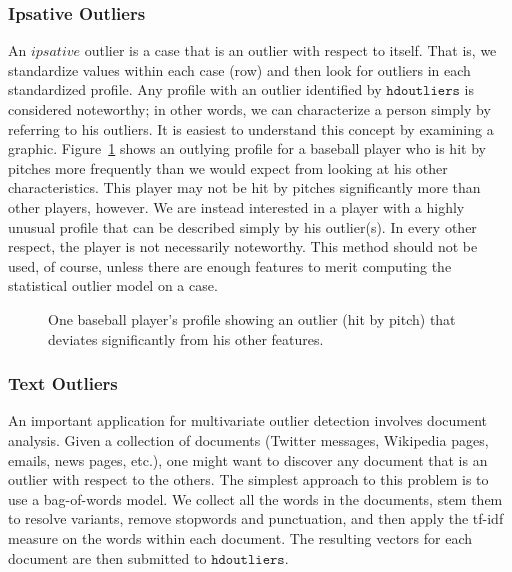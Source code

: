 \documentclass[12pt]{article}
\begin{document}
\subsubsection{Ipsative Outliers}
An $ipsative$ outlier is a case that is an outlier with respect to itself. That is, we standardize values within each case (row) and then look for outliers in each standardized profile. Any profile with an outlier identified by $\mathtt{hdoutliers}$ is considered noteworthy; in other words, we can characterize a person simply by referring to his outliers. It is easiest to understand this concept by examining a graphic. Figure~\ref{fig:baseball} shows an outlying profile for a baseball player who is hit by pitches more frequently than we would expect from looking at his other characteristics. This player may not be hit by pitches significantly more than other players, however. We are instead interested in a player with a highly unusual profile that can be described simply by his outlier(s). In every other respect, the player is not necessarily noteworthy. This method should not be used, of course, unless there are enough features to merit computing the statistical outlier model on a case.

\begin{figure}[h]
\caption{\label{fig:baseball} One baseball player's profile showing an outlier (hit by pitch) that deviates significantly from his other features.}
\end{figure}


\subsubsection{Text Outliers}
An important application for multivariate outlier detection involves document analysis. Given a collection of documents (Twitter messages, Wikipedia pages, emails, news pages, etc.), one might want to discover any document that is an outlier with respect to the others. The simplest approach to this problem is to use a bag-of-words model. We collect all the words in the documents, stem them to resolve variants, remove stopwords and punctuation, and then apply the tf-idf measure \citep{SaltonTFIDF} on the words within each document. The resulting vectors for each document are then submitted to $\mathtt{hdoutliers}$.
\end{document}
